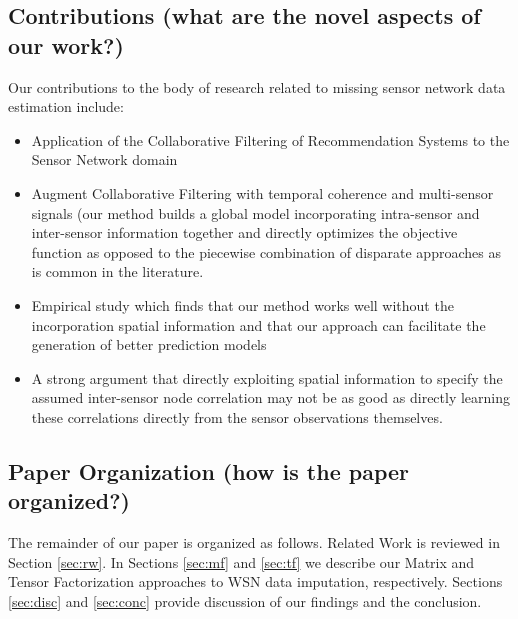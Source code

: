 \subsection{Contributions (what are the novel aspects of our work?)}
Our contributions to the body of research related to missing sensor network data estimation include:
\begin{itemize}
\item Application of the Collaborative Filtering of Recommendation Systems to the Sensor Network domain
\item Augment Collaborative Filtering with temporal coherence and multi-sensor signals (our method builds a global model incorporating intra-sensor and inter-sensor information together and directly optimizes the objective function as opposed to the piecewise combination of disparate approaches as is common in the literature.
\item Empirical study which finds that our method works well without the incorporation spatial information and that our approach can facilitate the generation of better prediction models
\item A strong argument that directly exploiting spatial information to specify the assumed inter-sensor node correlation may not be as good as directly learning these correlations directly from the sensor observations themselves.
\end{itemize}

\subsection{Paper Organization (how is the paper organized?)}
The remainder of our paper is organized as follows.
Related Work is reviewed in Section \ref{sec:rw}.
In Sections \ref{sec:mf} and \ref{sec:tf} we describe our Matrix and Tensor Factorization approaches to WSN data imputation, respectively.
Sections \ref{sec:disc} and \ref{sec:conc} provide discussion of our findings and the conclusion.
